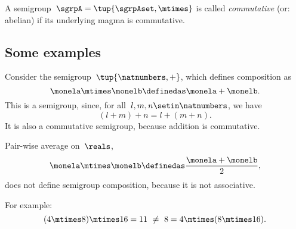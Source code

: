 \begin{definition}
    A semigroup~$\sgrpA = \tup{\sgrpAset, \mtimes}$ is called \emph{commutative} (or: abelian) if its underlying magma is commutative.
\end{definition}

\subsection{Some examples}

\begin{example}
    \label{exa:natnum-semigroup}
    Consider the semigroup~$\tup{\natnumbers,+}$, which defines composition as
    \begin{equation*}
        \label{eq:natnum-semigroup-definition}
        \monela \mtimes \monelb \definedas  \monela + \monelb.
    \end{equation*}
    This is a semigroup, since, for all~$l,m, n \setin \natnumbers$, we have
    \begin{equation*}
        (l+m) +n = l+(m+n).
    \end{equation*}
    It is also a commutative semigroup, because addition is commutative.
\end{example}

\begin{example}
    Pair-wise average on~$\reals$,
    \begin{equation}
        \label{eq:pairwise}
        \monela \mtimes \monelb \definedas  \frac{\monela + \monelb}{2},
    \end{equation}
    does not define semigroup composition, because it is not associative.

    For example:
    \begin{equation}
        \label{eq:pairwise-counterexample}
        (4 \mtimes 8) \mtimes 16 = 11\  \neq\   8 = 4 \mtimes (8 \mtimes 16).
    \end{equation}
\end{example}


